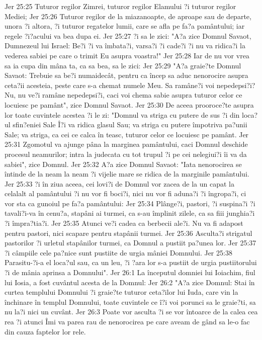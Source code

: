 Jer 25:25  Tuturor regilor Zimrei, tuturor regilor Elamului ?i tuturor regilor Mediei;
Jer 25:26  Tuturor regilor de la miazanoapte, de aproape sau de departe, unora ?i altora, ?i tuturor regatelor lumii, care se afla pe fa?a pamântului; iar regele ?i?acului va bea dupa ei.
Jer 25:27  ?i sa le zici: "A?a zice Domnul Savaot, Dumnezeul lui Israel: Be?i ?i va îmbata?i, varsa?i ?i cade?i ?i nu va ridica?i la vederea sabiei pe care o trimit Eu asupra voastra!"
Jer 25:28  Iar de nu vor vrea sa ia cupa din mâna ta, ca sa bea, sa le zici:
Jer 25:29  "A?a graie?te Domnul Savaot: Trebuie sa be?i numaidecât, pentru ca încep sa aduc nenorocire asupra ceta?ii acesteia, peste care s-a chemat numele Meu. Sa ramâne?i voi nepedepsi?i? Nu, nu ve?i ramâne nepedepsi?i, caci voi chema sabie asupra tuturor celor ce locuiesc pe pamânt", zice Domnul Savaot.
Jer 25:30  De aceea prooroce?te asupra lor toate cuvintele acestea ?i le zi: "Domnul va striga cu putere de sus ?i din loca?ul sfin?eniei Sale Î?i va ridica glasul Sau; va striga cu putere împotriva pa?unii Sale; va striga, ca cei ce calca în teasc, tuturor celor ce locuiesc pe pamânt.
Jer 25:31  Zgomotul va ajunge pâna la marginea pamântului, caci Domnul deschide procesul neamurilor; intra la judecata cu tot trupul ?i pe cei nelegiui?i îi va da sabiei", zice Domnul.
Jer 25:32  A?a zice Domnul Savaot: "Iata nenorocirea se întinde de la neam la neam ?i vijelie mare se ridica de la marginile pamântului.
Jer 25:33  ?i în ziua aceea, cei lovi?i de Domnul vor zacea de la un capat la celalalt al pamântului ?i nu vor fi boci?i, nici nu vor fi aduna?i ?i îngropa?i, ci vor sta ca gunoiul pe fa?a pamântului:
Jer 25:34  Plânge?i, pastori, ?i suspina?i ?i tavali?i-va în cenu?a, stapâni ai turmei, ca s-au împlinit zilele, ca sa fiii junghia?i ?i împra?tia?i.
Jer 25:35  Atunci ve?i cadea ca berbecii ale?i. Nu va fi adapost pentru pastori, nici scapare pentru stapânii turmei.
Jer 25:36  Asculta?i strigatul pastorilor ?i urletul stapânilor turmei, ca Domnul a pustiit pa?unea lor.
Jer 25:37  ?i câmpiile cele pa?nice sunt pustiite de urgia mâniei Domnului.
Jer 25:38  Parasitu-?i-a el loca?ul sau, ca un leu, ?i ?ara lor s-a pustiit de urgia pustiitorului ?i de mânia aprinsa a Domnului".
Jer 26:1  La începutul domniei lui Ioiachim, fiul lui Iosia, a fost cuvântul acesta de la Domnul:
Jer 26:2  "A?a zice Domnul: Stai în curtea templului Domnului ?i graie?te tuturor ceta?ilor lui Iuda, care vin la închinare în templul Domnului, toate cuvintele ce î?i voi porunci sa le graie?ti, sa nu la?i nici un cuvânt.
Jer 26:3  Poate vor asculta ?i se vor întoarce de la calea cea rea ?i atunci Îmi va parea rau de nenorocirea pe care aveam de gând sa le-o fac din cauza faptelor lor rele.
